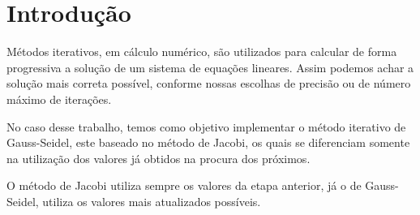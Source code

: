\chapter*[Introdução]{Introdução}
Métodos iterativos, em cálculo numérico, são utilizados para calcular de
forma progressiva a solução de um sistema de equações lineares. Assim
podemos achar a solução mais correta possível, conforme nossas escolhas
de precisão ou de número máximo de iterações.

No caso desse trabalho, temos como objetivo implementar o método iterativo de
Gauss-Seidel, este baseado no método de Jacobi, os quais se diferenciam
somente na utilização dos valores já obtidos na procura dos próximos.

O método de Jacobi utiliza sempre os valores da etapa anterior, já o de
Gauss-Seidel, utiliza os valores mais atualizados possíveis.